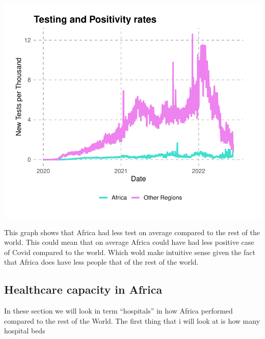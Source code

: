 \documentclass[12pt,preprint, authoryear]{elsarticle}
\let\origfigure\figure
\let\endorigfigure\endfigure
\renewenvironment{figure}[1][2] {
    \expandafter\origfigure\expandafter[H]
} {
    \endorigfigure
}
\numberwithin{equation}{section}
\numberwithin{figure}{section}
\numberwithin{table}{section}
\begin{document}
\begin{figure}[H]

{\centering \includegraphics{Q1_files/figure-latex/Figure2-1} 

}

\caption{Testing rates \label{Figure2}}\label{fig:Figure2}
\end{figure}

This graph shows that Africa had less test on average compared to the
rest of the world. This could mean that on average Africa could have had
less positive case of Covid compared to the world. Which wold make
intuitive sense given the fact that Africa does have less people that of
the rest of the world.

\hypertarget{healthcare-capacity-in-africa}{%
\subsection{Healthcare capacity in
Africa}\label{healthcare-capacity-in-africa}}

In these section we will look in term ``hospitals'' in how Africa
performed compared to the rest of the World. The first thing that i will
look at is how many hospital beds
\end{document}

